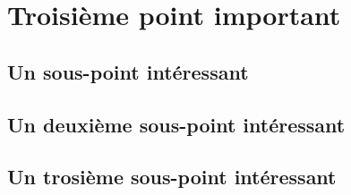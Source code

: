 \chapter{Troisième point important}

\section{Un sous-point intéressant}

\section{Un deuxième sous-point intéressant}

\section{Un trosième sous-point intéressant}